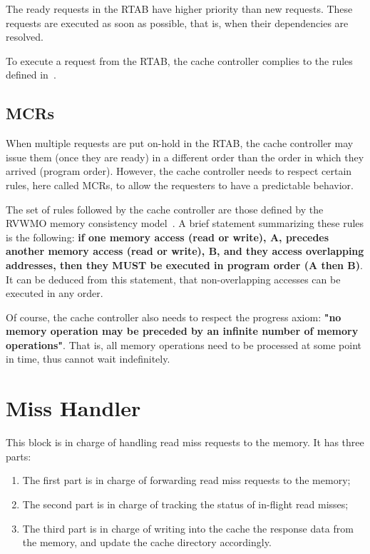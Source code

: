 \documentclass[10pt,titlepage,twoside]{book}
\begin{document}
The ready requests in the \ac{RTAB} have higher priority than new requests.
These requests are executed as soon as possible, that is, when their dependencies are resolved.

To execute a request from the \ac{RTAB}, the cache controller complies to the rules defined in~.

\subsection{\acfp*{MCR}}%

When multiple requests are put on-hold in the \ac{RTAB}, the cache controller may issue them (once they are ready) in a different order than the order in which they arrived (program order).
However, the cache controller needs to respect certain rules, here called \aclp{MCR}, to allow the requesters to have a predictable behavior.

The set of rules followed by the cache controller are those defined by the \ac{RVWMO} memory consistency model~\cite{RISCV_spec}.
A brief statement summarizing these rules is the following: \textbf{if one memory access (read or write), A, precedes another memory access (read or write), B, and they access overlapping addresses, then they MUST be executed in program order (A then B)}.
It can be deduced from this statement, that non-overlapping accesses can be executed in any order.

Of course, the cache controller also needs to respect the progress axiom: \textbf{"no memory operation may be preceded by an infinite number of memory operations"}.
That is, all memory operations need to be processed at some point in time, thus cannot wait indefinitely.


\section{Miss Handler}

This block is in charge of handling read miss requests to the memory.
It has three parts:
\begin{enumerate}
\item The first part is in charge of forwarding read miss requests to the memory;
\item The second part is in charge of tracking the status of in-flight read misses;
\item The third part is in charge of writing into the cache the response data from the memory, and update the cache directory accordingly.
\end{enumerate}
\end{document}
